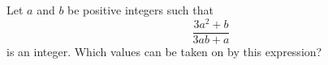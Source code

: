 Let $a$ and $b$ be positive integers such that
$$\frac{3a^2+b}{3ab+a}$$
is an integer. Which values can be taken on by this expression?